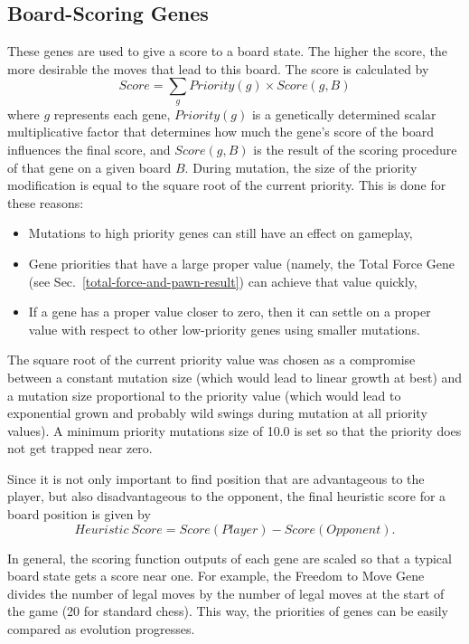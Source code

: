 \documentclass[letterpaper]{article}
\renewcommand{\_}{\allowbreak\textunderscore\allowbreak}
\begin{document}
\subsection{Board-Scoring Genes}\label{board-score-section}

These genes are used to give a score to a board state. The higher the score, the more desirable the moves that lead to this board. The score is calculated by
\[Score = \sum_g Priority(g) \times Score(g,B)\]
where \(g\) represents each gene, \(Priority(g)\) is a genetically determined scalar multiplicative factor that determines how much the gene's score of the board influences the final score, and \(Score(g,B)\) is the result of the scoring procedure of that gene on a given board \(B\). During mutation, the size of the priority modification is equal to the square root of the current priority. This is done for these reasons:
\begin{itemize}
	\item Mutations to high priority genes can still have an effect on gameplay,
	\item Gene priorities that have a large proper value (namely, the Total Force Gene (see Sec.~\ref{total-force-and-pawn-result}) can achieve that value quickly,
	\item If a gene has a proper value closer to zero, then it can settle on a proper value with respect to other low-priority genes using smaller mutations.
\end{itemize}
The square root of the current priority value was chosen as a compromise between a constant mutation size (which would lead to linear growth at best) and a mutation size proportional to the priority value (which would lead to exponential grown and probably wild swings during mutation at all priority values). A minimum priority mutations size of 10.0 is set so that the priority does not get trapped near zero.

Since it is not only important to find position that are advantageous to the player, but also disadvantageous to the opponent, the final heuristic score for a board position is given by
\[Heuristic\ Score = Score(Player) - Score(Opponent).\]

In general, the scoring function outputs of each gene are scaled so that a typical board state gets a score near one. For example, the Freedom to Move Gene divides the number of legal moves by the number of legal moves at the start of the game (20 for standard chess). This way, the priorities of genes can be easily compared as evolution progresses.
\end{document}
